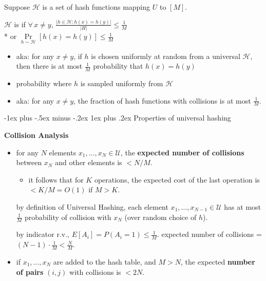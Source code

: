\documentclass[10pt, landscape]{article}
\makeatletter
\renewcommand{\subsubsection}{\@startsection{subsubsection}{3}{0mm}%
  {-1ex plus -.5ex minus -.2ex}%
  {1ex plus .2ex}%
{\normalfont\small\bfseries}}%
\makeatother
\begin{document}
\begin{multicols*}{4}
  Suppose $\mathcal{H}$ is a set of hash functions mapping $U$ to $[M]$. 

  \begin{tightcenter}
    $\mathcal{H}$ is  if $\forall \, x \neq y$,
    $\frac{\vert h \in \mathcal{H}: h(x) = h(y) \vert}{\vert H \vert} \leq \frac{1}{M} $
    \\* or $\mathop{Pr}\limits_{h \sim \mathcal{H}} [h(x) = h(y)] \leq \frac{1}{M}$
  \end{tightcenter}
  \begin{itemize}
    \item aka: for any $x \neq y$, if $h$ is chosen uniformly at random from a universal $\mathcal{H}$, then there is at most $ \frac{1}{M} $ probability that $h(x) = h(y)$
    \item probability where $h$ is sampled uniformly from $\mathcal{H}$
    \item aka: for any $x\neq y$, the fraction of hash functions with collisions is at most $\frac{1}{M}$.
  \end{itemize}

  \subsubsection{Properties of universal hashing}

  \textbf{Collision Analysis}

  \begin{itemize}
    \item for any $N$ elements $x_1, \dots, x_N \in \mathcal{U}$, the \textbf{expected number of collisions} between  $x_N$ and other elements is $<N/M$.
      \begin{itemize}
        \item it follows that for $K$ operations, the expected cost of the last operation is $< K/M = O(1)$ if $M>K$.
      \end{itemize}
      \begin{niceproof}
        by definition of Universal Hashing, each element  $x_1, \dots, x_{N-1} \in \mathcal{U}$ has at most $\frac{1}{M}$ probability of collision with $x_N$ (over random choice of $h$).

        by indicator r.v., $\scriptstyle E[A_i] = P(A_i = 1) \leq \frac{1}{M}$.
        expected number of collisions = $(N-1) \cdot \frac{1}{M} < \frac{N}{M}$.
      \end{niceproof}

    \item if $x_1, \dots, x_N$ are added to the hash table, and $M>N$, the expected \textbf{number of pairs} $(i, j)$ with collisions is $<2N$.


\end{itemize}
\end{multicols*}
\end{document}
